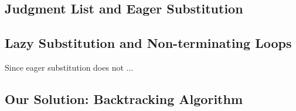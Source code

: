 \subsection{Judgment List and Eager Substitution}

\subsection{Lazy Substitution and Non-terminating Loops}

Since eager substitution does not ...


\subsection{Our Solution: Backtracking Algorithm}
